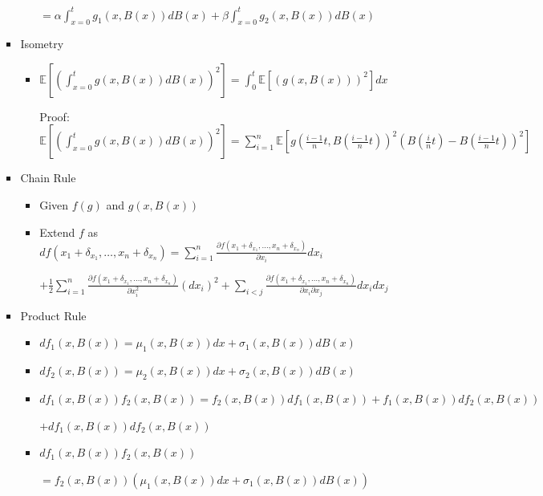 \documentclass[a4paper]{article}
\begin{document}
\begin{itemize}
\begin{itemize}
\begin{itemize}
\begin{itemize}
                                $= \alpha \int_{x=0}^t g_1(x, B(x)) dB(x) + \beta \int_{x=0}^t g_2(x, B(x)) dB(x)$
                        \end{itemize}
                    \item Isometry
                        \begin{itemize}
                            \item $\mathbb{E}[(\int_{x=0}^t g(x, B(x)) dB(x))^2] = \int_0^t \mathbb{E}[(g(x, B(x)) )^2] dx$

                                Proof: $\mathbb{E}[(\int_{x=0}^t g(x, B(x)) dB(x))^2] = \sum_{i=1}^n \mathbb{E}[ g(\frac{i-1}{n}t, B(\frac{i-1}{n}t))^2 (B(\frac{i}{n}t) - B(\frac{i-1}{n}t))^2]$
                        \end{itemize}
                    \item Chain Rule
                        \begin{itemize}
                            \item Given $f(g)$ and $g(x, B(x))$
                            \item Extend $f$ as $d f(x_1+ \delta_{x_1}, \dots, x_n + \delta_{x_n}) = \sum_{i=1}^n \frac{\partial f(x_1 + \delta_{x_1}, \dots, x_n + \delta_{x_n})}{\partial x_i} d x_i$

                                        $+ \frac{1}{2} \sum_{i=1}^n \frac{\partial f(x_1 + \delta_{x_1}, \dots, x_n + \delta_{x_n})}{\partial x_i^2} (d x_i)^2 + \sum_{i < j} \frac{\partial f(x_1 + \delta_{x_1}, \dots, x_n + \delta_{x_n})}{\partial x_i \partial x_j} d x_i d x_j$
                        \end{itemize}
                    \item Product Rule
                        \begin{itemize}
                            \item $d f_1(x, B(x)) = \mu_1(x, B(x)) dx + \sigma_1(x, B(x)) d B(x)$
                            \item $d f_2(x, B(x)) = \mu_2(x, B(x)) dx + \sigma_2(x, B(x)) d B(x)$
                            \item $df_1(x, B(x)) f_2(x, B(x)) = f_2(x, B(x)) df_1(x, B(x)) + f_1(x, B(x)) df_2(x, B(x))$

                                $+ d f_1(x, B(x)) df_2(x, B(x))$
                            \item $df_1(x, B(x)) f_2(x, B(x))$

                                $= f_2(x, B(x)) (\mu_1(x, B(x)) dx + \sigma_1(x, B(x)) d B(x))$


\end{itemize}
\end{itemize}
\end{itemize}
\end{itemize}
\end{document}
